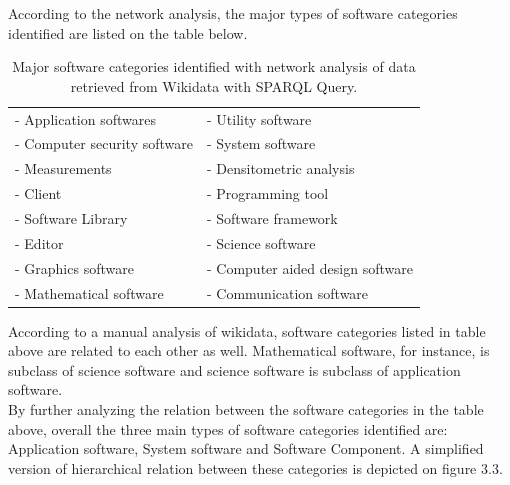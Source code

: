 \noindent According to the network analysis, the major types of software categories identified are listed on the table below.
\\
\begin{table}[h!]
	\begin{center}
		\caption{Major software categories identified with network analysis of data retrieved from Wikidata with SPARQL Query.}
		\label{tab:table1}
		\begin{tabular}{|l|l|} %
			
			\hline
			- Application softwares & -	Utility software  \\
			- Computer security software & - System software \\
			- Measurements   & - Densitometric analysis \\
			- Client       & - Programming tool   \\
			- Software Library        & - Software framework  \\
			- Editor  & - Science software     \\
			- Graphics software     & - Computer aided design software \\
			- Mathematical software          & - Communication software \\
			\hline
		\end{tabular}
	\end{center}
\end{table}

According to a manual analysis of wikidata, software categories listed  in table above are related to each other as well. Mathematical software, for instance, is subclass of science software and science software is subclass of application software. \\

By further analyzing the relation between the software categories in the table above, overall the three main types of software categories identified are:  Application software, System software and Software Component. A simplified version of  hierarchical relation between these categories is depicted on figure 3.3. 

